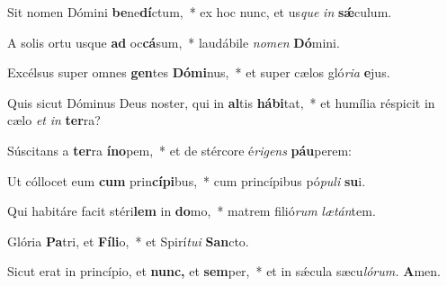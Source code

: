\item Sit nomen Dómini \textbf{be}ne\textbf{dí}ctum,~* ex hoc nunc, et us\tinyhspace\textit{que} \textit{in} \textbf{sǽ}culum.
\item A solis ortu usque \textbf{ad} oc\textbf{cá}sum,~* laudábile \textit{nomen} \textbf{Dó}mini.
\item Excélsus super omnes \textbf{gen}tes \textbf{Dómi}nus,~* et super cælos gló\textit{ria} \textbf{e}jus.
\item Quis sicut Dóminus Deus noster, qui in \textbf{al}tis \textbf{hábi}tat,~* et humília réspicit in cælo \textit{et} \textit{in} \textbf{ter}ra?
\item Súscitans a \textbf{ter}ra \textbf{íno}pem,~* et de stércore é\tinyhspace\textit{rigens} \textbf{páu}perem:
\item Ut cóllocet eum \textbf{cum} prin\textbf{cípi}bus,~* cum princípibus pó\textit{puli} \textbf{su}i.
\item Qui habitáre facit stéri\textbf{lem} in \textbf{do}mo,~* matrem filió\textit{rum} \textit{lætán}tem.
\item Glória \textbf{Pa}tri, et \textbf{Fíli}o,~* et Spirí\tinyhspace\textit{tui} \textbf{San}cto.
\item Sicut erat in princípio, et \textbf{nunc,} et \textbf{sem}per,~* et in sǽcula sæcu\tinyhspace\textit{lórum.} \textbf{A}men.
